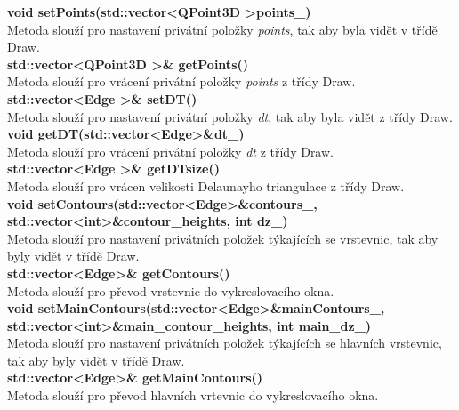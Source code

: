 \documentclass[a4paper,11pt,twoside]{article}
\begin{document}
\noindent\textbf{void setPoints(std::vector\textless QPoint3D \textgreater points\_)}\\
Metoda slouží pro nastavení privátní položky \textit{points}, tak aby byla vidět v třídě Draw.\\

\noindent\textbf{std::vector\textless QPoint3D \textgreater \& getPoints()}\\
Metoda slouží pro vrácení privátní položky \textit{points} z třídy Draw.\\

\noindent\textbf{std::vector\textless Edge \textgreater \& setDT()}\\
Metoda slouží pro nastavení privátní položky \textit{dt}, tak aby byla vidět z třídy Draw.\\

\noindent\textbf{void getDT(std::vector\textless Edge\textgreater \&dt\_)}\\
Metoda slouží pro vrácení privátní položky \textit{dt} z třídy Draw. \\

\noindent\textbf{std::vector\textless Edge \textgreater \& getDTsize()}\\
Metoda slouží pro vrácen velikosti Delaunayho triangulace z třídy Draw.\\

\noindent\textbf{void setContours(std::vector\textless Edge\textgreater\&contours\_, std::vector\textless int\textgreater\&contour\_heights, int dz\_)}\\
Metoda slouží pro nastavení privátních položek týkajících se vrstevnic, tak aby byly vidět v třídě Draw.\\

\noindent\textbf{std::vector\textless Edge\textgreater \& getContours()}\\
Metoda slouží pro převod vrstevnic do vykreslovacího okna.\\

\noindent\textbf{void setMainContours(std::vector\textless Edge\textgreater\&mainContours\_, std::vector\textless int\textgreater\&main\_contour\_heights, int main\_dz\_)}\\
Metoda slouží pro nastavení privátních položek týkajících se hlavních vrstevnic, tak aby byly vidět v třídě Draw.\\

\noindent\textbf{std::vector\textless Edge\textgreater \& getMainContours()}\\
Metoda slouží pro převod hlavních vrtevnic do vykreslovacího okna.\\
\end{document}
